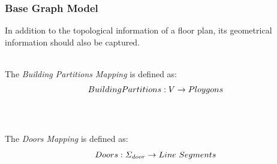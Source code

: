 \documentclass{beamer}
\begin{document}


\begin{frame}
\frametitle{Base Graph Model}

\small{In addition to the topological information of a floor plan, its geometrical information should also be captured.}
\\~\\
\pause

The \textrm{\em Building Partitions Mapping} is defined as:
\pause
\begin{equation}
\mathnormal{BuildingPartitions: V \rightarrow Ploygons}
\end{equation}
\\~\\
\pause

The \textrm{\em Doors Mapping} is defined as:
\pause
\begin{equation}
\mathnormal{Doors: \Sigma_{door} \rightarrow Line~Segments}
\end{equation}

\end{frame}

\end{document}
